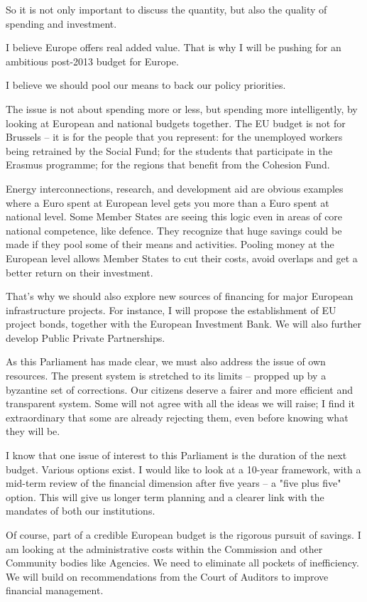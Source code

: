 \documentclass[a4paper,11pt]{article}
\begin{document}
So it is not only important to discuss the quantity, but also the quality of spending and investment.

I believe Europe offers real added value. That is why I will be pushing for an ambitious post-2013 budget for Europe.

I believe we should pool our means to back our policy priorities.

The issue is not about spending more or less, but spending more intelligently, by looking at European and national budgets together. The EU budget is not for Brussels – it is for the people that you represent: for the unemployed workers being retrained by the Social Fund; for the students that participate in the Erasmus programme; for the regions that benefit from the Cohesion Fund.

Energy interconnections, research, and development aid are obvious examples where a Euro spent at European level gets you more than a Euro spent at national level. Some Member States are seeing this logic even in areas of core national competence, like defence. They recognize that huge savings could be made if they pool some of their means and activities. Pooling money at the European level allows Member States to cut their costs, avoid overlaps and get a better return on their investment.

That's why we should also explore new sources of financing for major European infrastructure projects. For instance, I will propose the establishment of EU project bonds, together with the European Investment Bank. We will also further develop Public Private Partnerships.

As this Parliament has made clear, we must also address the issue of own resources. The present system is stretched to its limits – propped up by a byzantine set of corrections. Our citizens deserve a fairer and more efficient and transparent system. Some will not agree with all the ideas we will raise; I find it extraordinary that some are already rejecting them, even before knowing what they will be.

I know that one issue of interest to this Parliament is the duration of the next budget. Various options exist. I would like to look at a 10-year framework, with a mid-term review of the financial dimension after five years – a "five plus five" option. This will give us longer term planning and a clearer link with the mandates of both our institutions.

Of course, part of a credible European budget is the rigorous pursuit of savings. I am looking at the administrative costs within the Commission and other Community bodies like Agencies. We need to eliminate all pockets of inefficiency. We will build on recommendations from the Court of Auditors to improve financial management.
\end{document}
